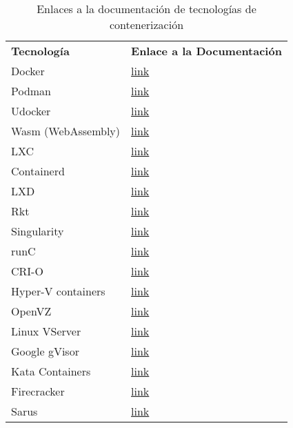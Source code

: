 \begin{table}[H]
\centering
{}
\begin{tabularx}{\textwidth}{>{\raggedright\arraybackslash}X >{\raggedright\arraybackslash}X}
\rowcolor{gray!30}
\textbf{Tecnología} & \textbf{Enlace a la Documentación} \\

Docker & \href{https://docs.docker.com/}{link} \\
Podman & \href{https://podman.io/docs}{link} \\
Udocker & \href{https://github.com/indigo-dc/udocker}{link} \\
Wasm (WebAssembly) & \href{https://webassembly.org/docs/faq/}{link} \\
LXC & \href{https://linuxcontainers.org/incus/docs/main/}{link} \\
Containerd & \href{https://containerd.io/docs/}{link} \\
LXD & \href{https://linuxcontainers.org/incus/docs/main/}{link} \\
Rkt & \href{https://github.com/rkt/rkt}{link} \\
Singularity & \href{https://docs.sylabs.io/guides/4.3/user-guide/}{link} \\
runC & \href{https://github.com/opencontainers/runc}{link} \\
CRI-O & \href{https://github.com/cri-o/cri-o}{link} \\
Hyper-V containers & \href{https://docs.microsoft.com/en-us/virtualization/windowscontainers/}{link} \\
OpenVZ & \href{https://openvz.org/}{link} \\
Linux VServer & \href{http://linux-vserver.org/Documentation}{link} \\
Google gVisor & \href{https://gvisor.dev/docs/}{link} \\
Kata Containers & \href{https://katacontainers.io/docs/}{link} \\
Firecracker & \href{https://firecracker-microvm.github.io/}{link} \\
Sarus & \href{https://github.com/eth-cscs/sarus}{link} \\

\end{tabularx}
\caption{Enlaces a la documentación de tecnologías de contenerización}
\end{table}